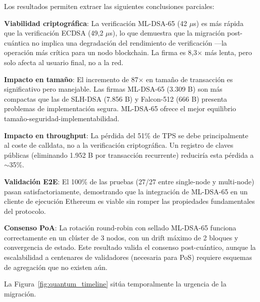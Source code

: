 Los resultados permiten extraer las siguientes conclusiones parciales:

\textbf{Viabilidad criptográfica}: La verificación ML-DSA-65 (42 $\mu$s) es más rápida que la verificación ECDSA (49,2 $\mu$s), lo que demuestra que la migración post-cuántica no implica una degradación del rendimiento de verificación ---la operación más crítica para un nodo blockchain. La firma es 8,3$\times$ más lenta, pero solo afecta al usuario final, no a la red.

\textbf{Impacto en tamaño}: El incremento de 87$\times$ en tamaño de transacción es significativo pero manejable. Las firmas ML-DSA-65 (3.309 B) son más compactas que las de SLH-DSA (7.856 B) y Falcon-512 (666 B) presenta problemas de implementación segura. ML-DSA-65 ofrece el mejor equilibrio tamaño-seguridad-implementabilidad.

\textbf{Impacto en throughput}: La pérdida del 51\% de TPS se debe principalmente al coste de calldata, no a la verificación criptográfica. Un registro de claves públicas (eliminando 1.952 B por transacción recurrente) reduciría esta pérdida a $\sim$35\%.

\textbf{Validación E2E}: El 100\% de las pruebas (27/27 entre single-node y multi-node) pasan satisfactoriamente, demostrando que la integración de ML-DSA-65 en un cliente de ejecución Ethereum es viable sin romper las propiedades fundamentales del protocolo.

\textbf{Consenso PoA}: La rotación round-robin con sellado ML-DSA-65 funciona correctamente en un clúster de 3 nodos, con un drift máximo de 2 bloques y convergencia de estado. Este resultado valida el consenso post-cuántico, aunque la escalabilidad a centenares de validadores (necesaria para PoS) requiere esquemas de agregación que no existen aún.

La Figura~\ref{fig:quantum_timeline} sitúa temporalmente la urgencia de la migración.

